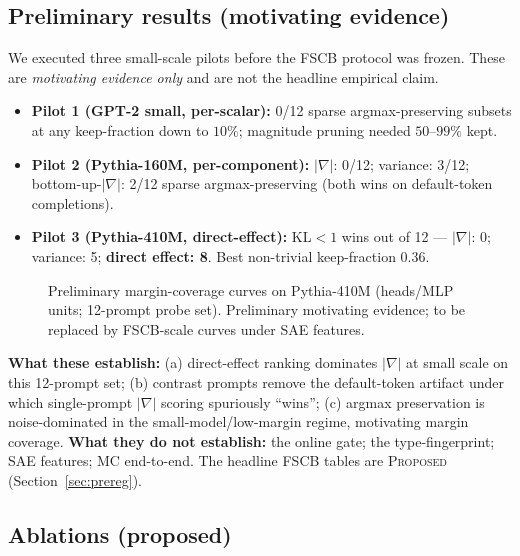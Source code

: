 \documentclass[10pt]{article}
\begin{document}
\subsection{Preliminary results (motivating evidence)}

We executed three small-scale pilots before the FSCB protocol was frozen. These are \emph{motivating evidence only} and are not the headline empirical claim.

\begin{itemize}
  \item \textbf{Pilot 1 (GPT-2 small, per-scalar):} 0/12 sparse argmax-preserving subsets at any keep-fraction down to $10\%$; magnitude pruning needed $50$--$99\%$ kept.
  \item \textbf{Pilot 2 (Pythia-160M, per-component):} $|\nabla|$: 0/12; variance: 3/12; bottom-up-$|\nabla|$: 2/12 sparse argmax-preserving (both wins on default-token completions).
  \item \textbf{Pilot 3 (Pythia-410M, direct-effect):} KL$<1$ wins out of 12 --- $|\nabla|$: 0; variance: 5; \textbf{direct effect: 8}. Best non-trivial keep-fraction 0.36.
\end{itemize}

\begin{figure}[t]
\centering
{}
\caption{Preliminary margin-coverage curves on Pythia-410M (heads/MLP units; 12-prompt probe set). Preliminary motivating evidence; to be replaced by FSCB-scale curves under SAE features.}
\label{fig:coverage}
\end{figure}

\textbf{What these establish:} (a) direct-effect ranking dominates $|\nabla|$ at small scale on this 12-prompt set; (b) contrast prompts remove the default-token artifact under which single-prompt $|\nabla|$ scoring spuriously ``wins''; (c) argmax preservation is noise-dominated in the small-model/low-margin regime, motivating margin coverage. \textbf{What they do not establish:} the online gate; the type-fingerprint; SAE features; MC end-to-end. The headline FSCB tables are \textsc{Proposed} (Section~\ref{sec:prereg}).

\subsection{Ablations (proposed)}
\end{document}
